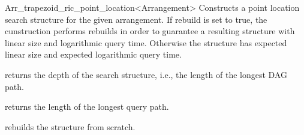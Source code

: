 \begin{ccRefClass}{Arr_trapezoid_ric_point_location<Arrangement>}
    {Constructs a point location search structure for the given arrangement. If rebuild is set to true, the cunstruction performs rebuilds in order to guarantee a resulting structure with linear size and logarithmic query time. Otherwise the structure has expected linear size and expected logarithmic query time.}

\ccAccessFunctions

  {returns the depth of the search structure, i.e., the length of the longest DAG path.}

  {returns the length of the longest query path.}

\ccModifiers

  {rebuilds the structure from scratch.}


\end{ccRefClass}

\ccRefPageEnd
